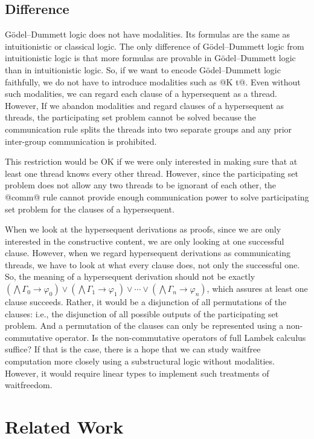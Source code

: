 \subsection{Difference}

G\"odel--Dummett logic does not have modalities.  Its formulas are the
same as intuitionistic or classical logic.  The only difference of
G\"odel--Dummett logic from intuitionistic logic is that more formulas
are provable in G\"odel--Dummett
logic than in intuitionistic logic.  So, if we want to encode G\"odel--Dummett
logic faithfully, we do not have to introduce modalities such as @K t@.
Even without such modalities, we can regard each clause of a
hypersequent as a thread. However,
If we abandon modalities and regard clauses of a hypersequent as
threads, the participating set problem cannot be solved because the communication rule
splits the threads into two separate groups and any prior
inter-group communication is prohibited.

This restriction would be OK if we were only interested in making sure that
at least one thread knows every other thread.  However, since the
participating set problem does not allow any two threads to be ignorant
of each other, the @comm@ rule cannot provide enough communication power
to solve participating set problem for the clauses of a hypersequent.

When we look at the hypersequent derivations as proofs, since we are only
interested in the constructive content, we are only looking at one
successful clause.  However, when we regard hypersequent derivations as
communicating threads, we have to look at what every clause does, not
only the successful one.  So, the meaning of a hypersequent derivation
should not be exactly
$\left(\bigwedge\Gamma_0\rightarrow\varphi_0\right)\vee\left(\bigwedge\Gamma_1\rightarrow\varphi_1\right)\vee\cdots\vee\left(\bigwedge
\Gamma_n\rightarrow\varphi_n\right)$, which assures at least one clause
succeeds.
Rather, it would be a disjunction of all permutations of the clauses:
i.e., the disjunction of all possible outputs of the participating set problem.
And a permutation of the clauses can only be represented using a
non-commutative operator.  Is the non-commutative operators of
full Lambek calculus suffice?  If that is the case, there is a hope that
we can study
waitfree computation more closely using a substructural logic without
modalities.
However, it would require linear types to implement such treatments of
waitfreedom.

\section{Related Work}

